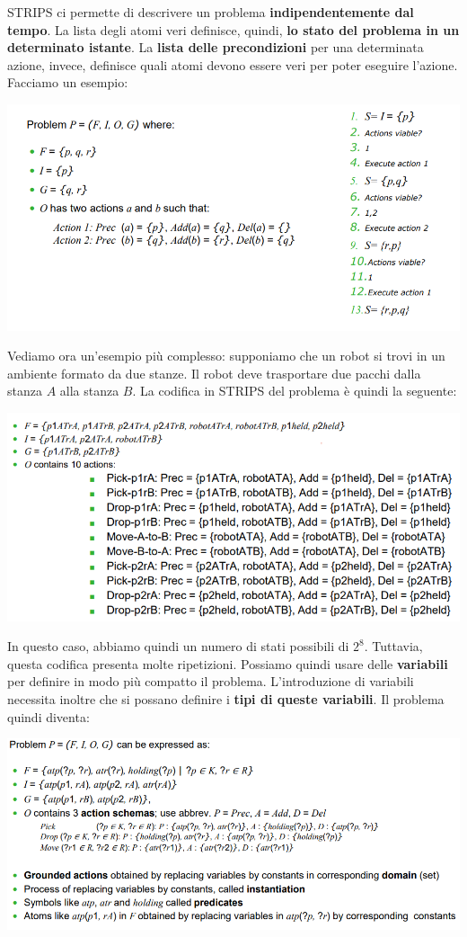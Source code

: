 \documentclass[12pt]{article}
\begin{document}
STRIPS ci permette di descrivere un problema \textbf{indipendentemente dal tempo}.
La lista degli atomi veri definisce, quindi, \textbf{lo stato del problema in un determinato istante}.
La \textbf{lista delle precondizioni} per una determinata azione, invece, definisce quali atomi devono essere veri per poter eseguire l'azione.
Facciamo un esempio:
\begin{center}
    \includegraphics[width =1\linewidth]{Images/53.PNG}
\end{center}
Vediamo ora un'esempio più complesso: supponiamo che un robot si trovi in un ambiente formato da due stanze.
Il robot deve trasportare due pacchi dalla stanza $A$ alla stanza $B$. La codifica in STRIPS del problema è quindi la
seguente:
\begin{center}
    \includegraphics[width =1\linewidth]{Images/54.PNG}
\end{center}
In questo caso, abbiamo quindi un numero di stati possibili di $2^8$.
Tuttavia, questa codifica presenta molte ripetizioni. Possiamo quindi usare delle \textbf{variabili} per 
definire in modo più compatto il problema. L'introduzione di variabili necessita inoltre che si possano definire
i \textbf{tipi di queste variabili}. Il problema quindi diventa:
\begin{center}
    \includegraphics[width =1\linewidth]{Images/55.PNG}
\end{center}
\newpage
\end{document}

